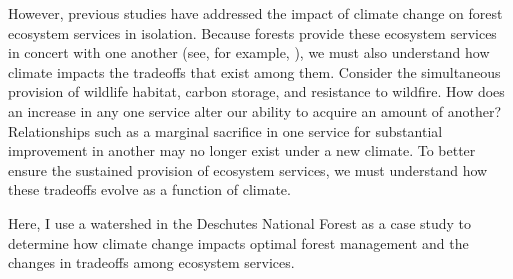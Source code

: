 However, previous studies have addressed the impact of climate change on forest ecosystem services in isolation. Because forests provide these ecosystem services in concert with one another (see, for example, \cite{toth2009finding}), we must also understand how climate impacts the tradeoffs that exist among them. Consider the simultaneous provision of wildlife habitat, carbon storage, and resistance to wildfire. How does an increase in any one service alter our ability to acquire an amount of another? Relationships such as a marginal sacrifice in one service for substantial improvement in another may no longer exist under a new climate. To better ensure the sustained provision of ecosystem services, we must understand how these tradeoffs evolve as a function of climate.

Here, I use a watershed in the Deschutes National Forest as a case study to determine how climate change impacts optimal forest management and the changes in tradeoffs among ecosystem services.